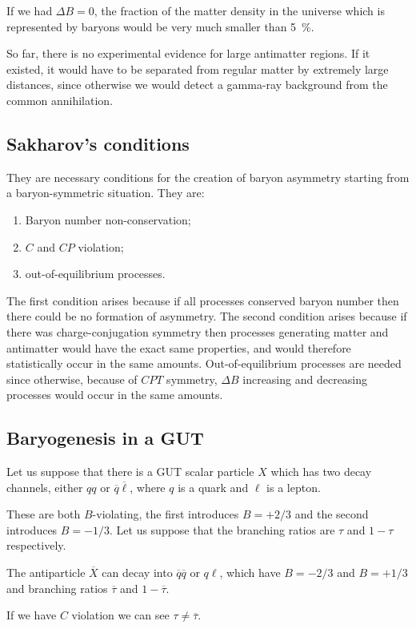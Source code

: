 \documentclass[main.tex]{subfiles}
\begin{document}
If we had \(\Delta B = 0\), the fraction of the matter density in the universe which is represented by baryons would be very much smaller than \SI{5}{\percent}. 

So far, there is no experimental evidence for large antimatter regions.
If it existed, it would have to be separated from regular matter by extremely large distances, since otherwise we would detect a gamma-ray background from the common annihilation. 

\subsection{Sakharov's conditions}

They are necessary conditions for the creation of baryon asymmetry starting from a baryon-symmetric situation. 
They are: 
\begin{enumerate}
    \item Baryon number non-conservation;
    \item \(C\) and \(CP\) violation;
    \item out-of-equilibrium processes.
\end{enumerate}

The first condition arises because if all processes conserved baryon number then there could be no formation of asymmetry. 
The second condition arises because if there was charge-conjugation symmetry then processes generating matter and antimatter would have the exact same properties, and would therefore statistically occur in the same amounts.
Out-of-equilibrium processes are needed since otherwise, because of \(CPT\) symmetry, \(\Delta B\) increasing and decreasing processes would occur in the same amounts. 

\subsection{Baryogenesis in a GUT}

Let us suppose that there is a GUT scalar particle \(X\) which has two decay channels, either \(qq\) or \(\overline{q} \overline{\ell}\), where \(q\) is a quark and \(\ell\) is a lepton. 

These are both \(B\)-violating, the first introduces \(B = +2/3\) and the second introduces \(B = - 1/3\).
Let us suppose that the branching ratios are \(\tau \) and \(1 - \tau \) respectively. 

The antiparticle \(\overline{X}\) can decay into \(\overline{q} \overline{q}\) or \(q \ell\), which have \(B = - 2/3\) and \(B = + 1/3\) and branching ratios \(\overline{\tau}\) and \(1 - \overline{\tau}\).

If we have \(C\) violation we can see \(\tau \neq \overline{\tau}\). 
\end{document}
